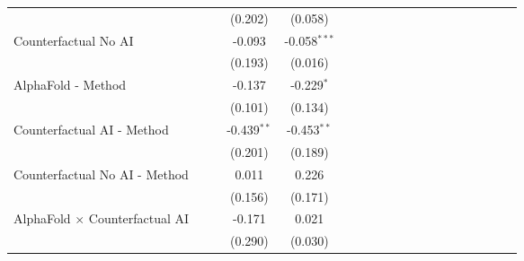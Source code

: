 \begin{tabular}{lcccccccccccccccccc}
                                                              &       &       & (0.202)       & (0.058)        &       &       &       &       &     &      &      &      &      &      &      &      &      &   \\   
   Counterfactual No AI                                       &       &       & -0.093        & -0.058$^{***}$ &       &       &       &       &     &      &      &      &      &      &      &      &      &   \\   
                                                              &       &       & (0.193)       & (0.016)        &       &       &       &       &     &      &      &      &      &      &      &      &      &   \\   
   AlphaFold - Method                                         &       &       & -0.137        & -0.229$^{*}$   &       &       &       &       &     &      &      &      &      &      &      &      &      &   \\   
                                                              &       &       & (0.101)       & (0.134)        &       &       &       &       &     &      &      &      &      &      &      &      &      &   \\   
   Counterfactual AI - Method                                 &       &       & -0.439$^{**}$ & -0.453$^{**}$  &       &       &       &       &     &      &      &      &      &      &      &      &      &   \\   
                                                              &       &       & (0.201)       & (0.189)        &       &       &       &       &     &      &      &      &      &      &      &      &      &   \\   
   Counterfactual No AI - Method                              &       &       & 0.011         & 0.226          &       &       &       &       &     &      &      &      &      &      &      &      &      &   \\   
                                                              &       &       & (0.156)       & (0.171)        &       &       &       &       &     &      &      &      &      &      &      &      &      &   \\   
   AlphaFold $\times$ Counterfactual AI                       &       &       & -0.171        & 0.021          &       &       &       &       &     &      &      &      &      &      &      &      &      &   \\   
                                                              &       &       & (0.290)       & (0.030)        &       &       &       &       &     &      &      &      &      &      &      &      &      &   \\   

\end{tabular}

